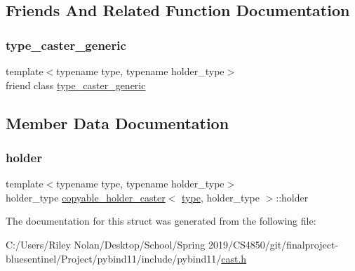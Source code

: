 \subsection{Friends And Related Function Documentation}
\mbox{\label{structcopyable__holder__caster_a47dd585b718e81e33e44307daa659ba4}} 
\subsubsection{\texorpdfstring{type\_caster\_generic}{type\_caster\_generic}}
{\footnotesize\ttfamily template$<$typename type, typename holder\+\_\+type$>$ \\
friend class \mbox{\hyperlink{classtype__caster__generic}{type\+\_\+caster\+\_\+generic}}\hspace{0.3cm}{\ttfamily [friend]}}



\subsection{Member Data Documentation}
\mbox{\label{structcopyable__holder__caster_a63b9604b16a2e9be8193d5cd0294c410}} 
\subsubsection{\texorpdfstring{holder}{holder}}
{\footnotesize\ttfamily template$<$typename type, typename holder\+\_\+type$>$ \\
holder\+\_\+type \mbox{\hyperlink{structcopyable__holder__caster}{copyable\+\_\+holder\+\_\+caster}}$<$ \mbox{\hyperlink{_s_d_l__opengl_8h_ad5ddf6fca7b585646515660e810e0188}{type}}, holder\+\_\+type $>$\+::holder\hspace{0.3cm}{\ttfamily [protected]}}



The documentation for this struct was generated from the following file\+:\begin{DoxyCompactItemize}
\item 
C\+:/\+Users/\+Riley Nolan/\+Desktop/\+School/\+Spring 2019/\+C\+S4850/git/finalproject-\/bluesentinel/\+Project/pybind11/include/pybind11/\mbox{\hyperlink{cast_8h}{cast.\+h}}\end{DoxyCompactItemize}
